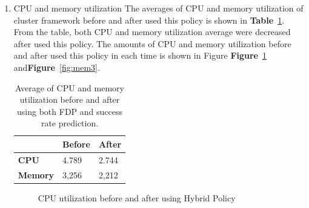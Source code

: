 \documentclass[12pt,oneside,openright,a4paper]{cpe-english-project}
\begin{document}
\begin{enumerate}
  \item CPU and memory utilization
  \newline
The averages of CPU and memory utilization of cluster framework before and after used this policy is shown in \textbf{Table}~\ref{tbl:po3CPUMem}. From the table, both CPU and memory utilization average were decreased after used this policy. The amounts of CPU and memory utilization before and after used this policy in each time is shown in Figure \textbf{Figure}~\ref{fig:cpu3} and\textbf{Figure}~\ref{fig:mem3}.    
  \begin{table}[!h]
  \caption{Average of CPU and memory utilization before and after using both FDP and success rate prediction.}\label{tbl:po3CPUMem}
  \begin{tabular}{@{}|p{}|p{}|p{}|}
   \hline
   \textbf{} & \textbf{Before} & \textbf{After} \\ 
   \hline
   \textbf{CPU} & 4.789 & 2.744 \\ 
   \hline
   \textbf{Memory} & 3,256 & 2,212 \\ 
   \hline                     
  \end{tabular}
\end{table}
\begin{figure}[!h]\centering
    \setlength{\fboxrule}{0mm} %
    \setlength{\fboxsep}{0cm}
    \caption{CPU utilization before and after using Hybrid Policy}\label{fig:cpu3}
\end{figure}
\begin{figure}[!h]\centering
    \setlength{\fboxrule}{0mm} %
    \setlength{\fboxsep}{0cm}

\end{figure}
\end{enumerate}
\end{document}
